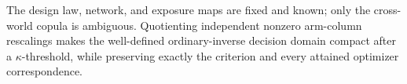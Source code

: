 The design law, network, and exposure maps are fixed and known; only the cross-world copula is ambiguous.  Quotienting independent nonzero arm-column rescalings makes the well-defined ordinary-inverse decision domain compact after a \(\kappa\)-threshold, while preserving exactly the criterion and every attained optimizer correspondence.
